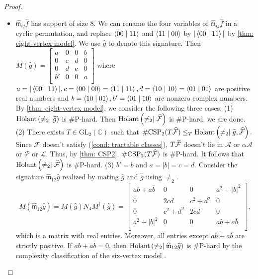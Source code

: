 \begin{proof}
\begin{itemize}
    \item $\widehat{\mathfrak{m}}_{ij}\widehat f$ has support of size $8$. 
    We can rename the four variables of $\widehat{\mathfrak{m}}_{ij}\widehat f$ in a cyclic permutation, and replace $\braket{00\mid 11}$ and $\braket{11\mid 00}$ by $|\braket{00\mid 11}|$ by \cref{thm: eight-vertex model}.
    We use $\widehat{g}$ to denote this signature.
    Then $M(\widehat g)= \left[\begin{smallmatrix}
    a & 0 & 0 & b\\
    0 & c & d & 0\\
    0 & d & c & 0\\
    b' & 0 & 0 & a\\
    \end{smallmatrix}\right]$ where $a=|\braket{00\mid 11}|, c=\braket{00\mid 00}=\braket{11\mid 11},d=\braket{10\mid 10}=\braket{01\mid 01}$ are positive real numbers and $ b=\braket{10\mid 01}, b'=\braket{01\mid 10}$ are nonzero complex numbers. 
    By \cref{thm: eight-vertex model}, we consider the following three cases:
    (1) $\operatorname{Holant}\left(\neq_2\mid \widehat{g}\right)$ is \#P-hard.
    Then $\operatorname{Holant}\left(\neq_2\mid \widehat{\mathcal{F}}\right)$ is \#P-hard, we are done.
    (2) There exists $T\in\mathrm{GL}_2(\mathbb{C})$ such that $\#\mathrm{CSP}_2(T\widehat{\mathcal{F}})\le_T\operatorname{Holant}\left(\neq_2\mid \widehat{g},\widehat{\mathcal{F}}\right).$
    Since $\mathcal{F}$ doesn't satisfy \rm{(\ref{cond: tractable classes})}, $T\widehat{\mathcal{F}}$ doesn't lie in $\mathscr{A}$ or $\alpha\mathscr{A}$ or $\mathscr{P}$ or $\mathscr{L}$.
    Thus, by \cref{thm: CSP2}, $\#\mathrm{CSP}_2(T\widehat{\mathcal{F}})$ is \#P-hard.
    It follows that $\operatorname{Holant}\left(\neq_2\mid \widehat{\mathcal{F}}\right)$ is \#P-hard.
    (3) $b'= b$ and $a=|b|=c=d$.
    Consider the signature $\widehat{\mathfrak{m}}_{12}\widehat{g}$ realized by mating $\widehat{g}$ and $\widehat{\overline{g}}$ using $\neq_2$.
    $$M(\widehat{\mathfrak{m}}_{12}\widehat{g})=M(\widehat g)N_4M^{\dagger}(\widehat g)= \left[\begin{matrix}
    ab+a\overline{b} & 0 & 0 & a^2+|b|^2\\
    0 &  2cd & c^2+d^2 & 0\\
    0 & c^2+d^2 & 2cd  & 0\\
    a^2+|b|^2 & 0 & 0 &  ab+a\overline{b}\\
    \end{matrix}\right],$$
    which is a matrix with real entries. 
    Moreover, all entries except $ab+a\overline{b}$ are strictly positive.
    If $ab+a\overline{b}=0$, then $\operatorname{Holant}\left(\neq_2\mid \widehat{\mathfrak{m}}_{12}\widehat{g}\right)$ is \#P-hard by the complexity classification of the six-vertex model \cite{six-vertex_model}.

\end{itemize}
\end{proof}
